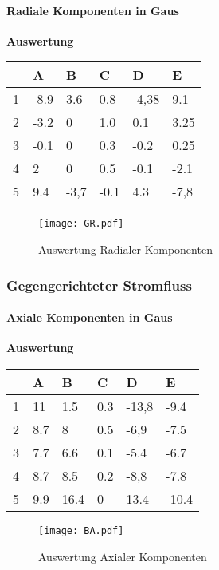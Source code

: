 \documentclass{article}
\begin{document}
\paragraph{Radiale Komponenten in Gaus}
\textbf{Auswertung}
\begin{table}[H]
	\centering
	\begin{tabular}{|l|l|l|l|l|l|}
		\hline
		~ & A    & B    & C    & D     & E    \\ \hline
		1 & -8.9 & 3.6  & 0.8  & -4,38 & 9.1  \\ 
		2 & -3.2 & 0    & 1.0  & 0.1   & 3.25 \\ 
		3 & -0.1 & 0    & 0.3  & -0.2  & 0.25 \\ 
		4 & 2    & 0    & 0.5  & -0.1  & -2.1 \\ 
		5 & 9.4  & -3,7 & -0.1 & 4.3   & -7,8 \\
		\hline
	\end{tabular}
\end{table}
\begin{figure}[H]
	\centering
	\texttt{[image: GR.pdf]} 
	\caption{Auswertung Radialer Komponenten}
\end{figure}
\newpage
\subsubsection{Gegengerichteter Stromfluss}
\paragraph{Axiale Komponenten in Gaus}
\textbf{Auswertung}
\begin{table}[H]
	\centering
	\begin{tabular}{|l|l|l|l|l|l|}
		\hline
		~ & A   & B    & C   & D     & E     \\ \hline
		1 & 11  & 1.5  & 0.3 & -13,8 & -9.4  \\ 
		2 & 8.7 & 8    & 0.5 & -6,9  & -7.5  \\ 
		3 & 7.7 & 6.6  & 0.1 & -5.4  & -6.7  \\ 
		4 & 8.7 & 8.5  & 0.2 & -8,8  & -7.8  \\ 
		5 & 9.9 & 16.4 & 0   & 13.4  & -10.4 \\
		\hline
	\end{tabular}
\end{table}
\begin{figure}[H]
	\centering
	\texttt{[image: BA.pdf]} 
	\caption{Auswertung Axialer Komponenten}
\end{figure}
\newpage
\end{document}
